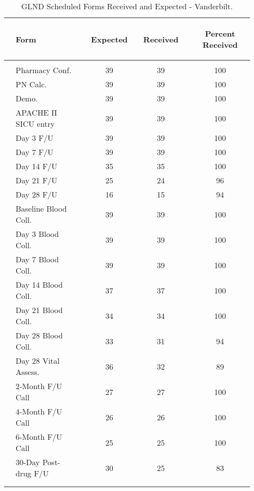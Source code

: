 \documentclass[dvips, 10pt]{article}
\begin{document}
\clearpage
\begin{table}[t]
\caption
{ GLND Scheduled Forms Received and Expected - Vanderbilt. }
\begin{center}
\begin{tabular}{ @{}l@{}
@{}l@{}@{}p{1.5em}@{}@{}c@{}@{}p{1.5em}@{}@{}c@{}@{}p{1.5em}@{}@{}c@{}
}
\hline

& \parbox{6em}{\begin{center}Form\end{center}} && \parbox{6em}{\begin{center}Expected\end{center}} && \parbox{6em}{\begin{center}Received\end{center}} && \parbox{6em}{\begin{center}Percent Received\end{center}} \\

\hline

\\
& Pharmacy Conf. && 39 && 39 && 100 \\
& PN Calc. && 39 && 39 && 100 \\
& Demo. && 39 && 39 && 100 \\
& APACHE II SICU entry && 39 && 39 && 100 \\
& Day 3 F/U && 39 && 39 && 100 \\
& Day 7 F/U && 39 && 39 && 100 \\
& Day 14 F/U && 35 && 35 && 100 \\
& Day 21 F/U && 25 && 24 && 96 \\
& Day 28 F/U && 16 && 15 && 94 \\
& Baseline Blood Coll. && 39 && 39 && 100 \\
& Day 3 Blood Coll. && 39 && 39 && 100 \\
& Day 7 Blood Coll. && 39 && 39 && 100 \\
& Day 14 Blood Coll. && 37 && 37 && 100 \\
& Day 21 Blood Coll. && 34 && 34 && 100 \\
& Day 28 Blood Coll. && 33 && 31 && 94 \\
& Day 28 Vital Assess. && 36 && 32 && 89 \\
& 2-Month F/U Call && 27 && 27 && 100 \\
& 4-Month F/U Call && 26 && 26 && 100 \\
& 6-Month F/U Call && 25 && 25 && 100 \\
& 30-Day Post-drug F/U && 30 && 25 && 83 \\
\\
\hline \\

\end{tabular}

\end{center}
 \end{table}
\end{document}
